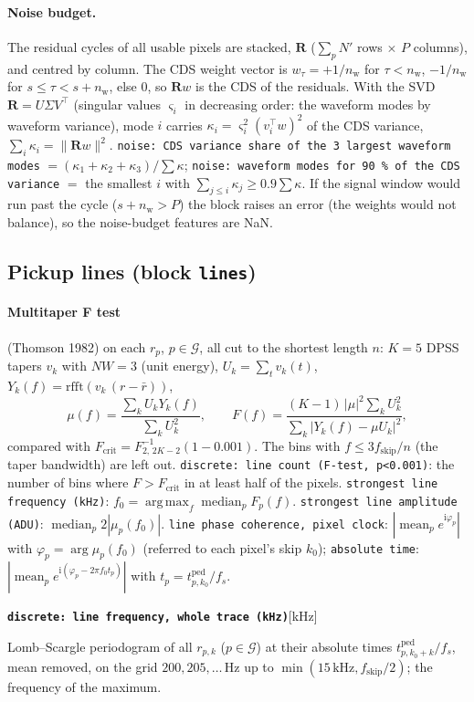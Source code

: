 \documentclass[10pt]{article}
\newcommand{\code}[1]{\texttt{#1}}
\newcommand{\feat}[2]{\par\medskip\noindent\textbf{\texttt{#1}}\hfill{\small [#2]}\par\nopagebreak\smallskip}
\newcommand{\med}{\operatorname*{median}}
\newcommand{\mean}{\operatorname*{mean}}
\newcommand{\argmax}{\operatorname*{arg\,max}}
\newcommand{\nw}{n_\text{w}}
\newcommand{\ko}{k_0}
\newcommand{\G}{\mathcal G}
\begin{document}
\paragraph{Noise budget.} The residual cycles of all usable pixels are stacked, $\mathbf R$ ($\sum_p N'$ rows $\times$ $P$ columns), and
centred by column. The CDS weight vector is $w_\tau = +1/\nw$ for $\tau < \nw$, $-1/\nw$ for $s \le \tau < s + \nw$, else 0, so
$\mathbf R w$ is the CDS of the residuals. With the SVD $\mathbf R = U\Sigma V^\top$ (singular values $\varsigma_i$ in decreasing order:
the waveform modes by waveform variance), mode $i$ carries $\kappa_i = \varsigma_i^2 (v_i^\top w)^2$ of the CDS variance,
$\sum_i\kappa_i = \|\mathbf Rw\|^2$.
\code{noise: CDS variance share of the 3 largest waveform modes} $= (\kappa_1+\kappa_2+\kappa_3)/\sum\kappa$;
\code{noise: waveform modes for 90 \% of the CDS variance} $=$ the smallest $i$ with $\sum_{j\le i}\kappa_j \ge 0.9\sum\kappa$. If the signal window would run past the cycle ($s + \nw > P$) the block raises an error (the weights would not balance), so the noise-budget features are NaN.

\subsection{Pickup lines (block \code{lines})}

\paragraph{Multitaper F test} (Thomson 1982) on each $r_p$, $p\in\G$, all cut to the shortest length $n$: $K = 5$ DPSS tapers $v_k$ with
$NW = 3$ (unit energy), $U_k = \sum_t v_k(t)$, $Y_k(f) = \mathrm{rfft}(v_k\,(r - \bar r))$,
\begin{equation}
\mu(f) = \frac{\sum_k U_kY_k(f)}{\sum_kU_k^2},\qquad
F(f) = \frac{(K-1)\,|\mu|^2\sum_kU_k^2}{\sum_k|Y_k(f) - \mu U_k|^2},
\end{equation}
compared with $F_\text{crit} = F^{-1}_{2,\,2K-2}(1 - 0.001)$. The bins with $f \le 3f_\text{skip}/n$ (the taper bandwidth) are left out.
\code{discrete: line count (F-test, p<0.001)}: the number of bins where $F > F_\text{crit}$ in at least half of the pixels.
\code{strongest line frequency (kHz)}: $f_0 = \argmax_f\med_pF_p(f)$. \code{strongest line amplitude (ADU)}: $\med_p 2|\mu_p(f_0)|$.
\code{line phase coherence, pixel clock}: $|\mean_p e^{\mathrm i\varphi_p}|$ with $\varphi_p = \arg\mu_p(f_0)$ (referred to each pixel's
skip $\ko$); \code{absolute time}: $|\mean_p e^{\mathrm i(\varphi_p - 2\pi f_0t_p)}|$ with $t_p = t^\text{ped}_{p,\ko}/f_s$.
\feat{discrete: line frequency, whole trace (kHz)}{kHz}
Lomb--Scargle periodogram of all $r_{p,k}$ ($p\in\G$) at their absolute times $t^\text{ped}_{p,\ko+k}/f_s$, mean removed, on the grid
$200, 205, \dots$\,Hz up to $\min(15\,\text{kHz}, f_\text{skip}/2)$; the frequency of the maximum.
\end{document}
